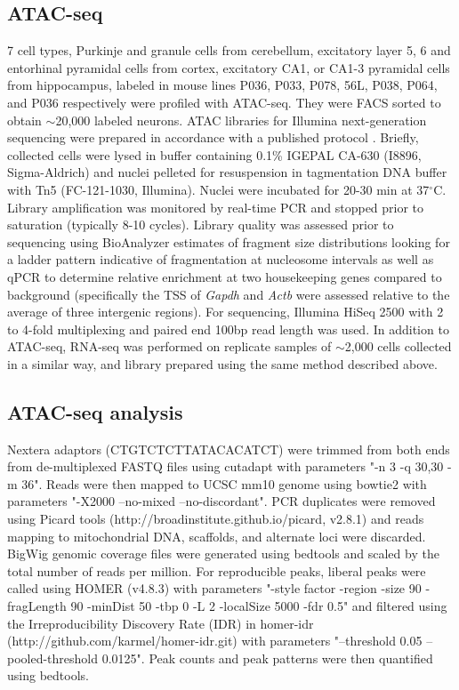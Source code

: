 \subsection{ATAC-seq}
7 cell types, Purkinje and granule cells from cerebellum, excitatory layer 5, 6 and entorhinal pyramidal cells from cortex, excitatory CA1, or CA1-3 pyramidal cells from hippocampus, labeled in mouse lines P036, P033, P078, 56L, P038, P064, and P036 respectively \citep[all from][]{Shima_2016} were profiled with ATAC-seq. They were FACS sorted to obtain $\sim$20,000 labeled neurons. ATAC libraries for Illumina next-generation sequencing were prepared in accordance with a published protocol \citep{Buenrostro_2013}. Briefly, collected cells were lysed in buffer containing 0.1\% IGEPAL CA-630 (I8896, Sigma-Aldrich) and nuclei pelleted for resuspension in tagmentation DNA buffer with Tn5 (FC-121-1030, Illumina). Nuclei were incubated for 20-30 min at 37$^{\circ}$C. Library amplification was monitored by real-time PCR and stopped prior to saturation (typically 8-10 cycles). Library quality was assessed prior to sequencing using BioAnalyzer estimates of fragment size distributions looking for a ladder pattern indicative of fragmentation at nucleosome intervals as well as qPCR to determine relative enrichment at two housekeeping genes compared to background (specifically the TSS of \textit{Gapdh} and \textit{Actb} were assessed relative to the average of three intergenic regions). For sequencing, Illumina HiSeq 2500 with 2 to 4-fold multiplexing and paired end 100bp read length was used. In addition to ATAC-seq, RNA-seq was performed on replicate samples of $\sim$2,000 cells collected in a similar way, and library prepared using the same method described above.

\subsection{ATAC-seq analysis}
Nextera adaptors (CTGTCTCTTATACACATCT) were trimmed from both ends from de-multiplexed FASTQ files using cutadapt with parameters "-n 3 -q 30,30 -m 36". Reads were then mapped to UCSC mm10 genome using bowtie2 \citep{Langmead_2012} with parameters "-X2000 --no-mixed --no-discordant". PCR duplicates were removed using Picard tools (http://broadinstitute.github.io/picard, v2.8.1) and reads mapping to mitochondrial DNA, scaffolds, and alternate loci were discarded. BigWig genomic coverage files were generated using bedtools \citep{Quinlan_2010} and scaled by the total number of reads per million. For reproducible peaks, liberal peaks were called using HOMER (v4.8.3) \citep{Heinz_2010} with parameters "-style factor -region -size 90 -fragLength 90 -minDist 50 -tbp 0 -L 2 -localSize 5000 -fdr 0.5" and filtered using the Irreproducibility Discovery Rate (IDR) in homer-idr (http://github.com/karmel/homer-idr.git) with parameters "--threshold 0.05 --pooled-threshold 0.0125". Peak counts and peak patterns were then quantified using bedtools.

